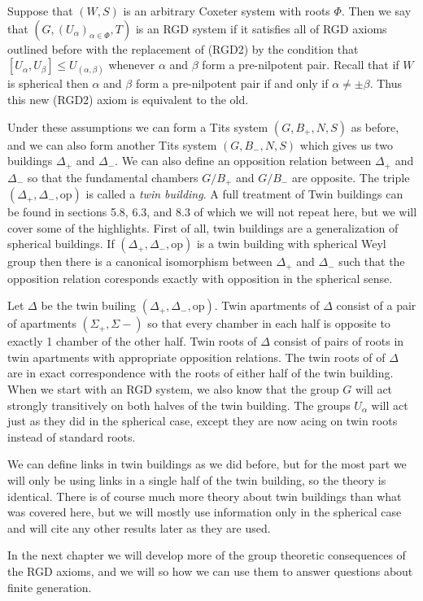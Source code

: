 \documentclass[class=book, crop=false,12 pt]{standalone}
\begin{document}
Suppose that $(W,S)$ is an arbitrary Coxeter system with roots $\Phi.$ Then we say that $(G,(U_\alpha)_{\alpha\in \Phi},T)$ is an RGD system if it satisfies all of RGD axioms outlined before with the replacement of (RGD2) by the condition that $[U_\alpha,U_\beta]\le U_{(\alpha,\beta)}$ whenever $\alpha$ and $\beta$ form a pre-nilpotent pair. Recall that if $W$ is spherical then $\alpha$ and $\beta$ form a pre-nilpotent pair if and only if $\alpha\neq \pm \beta.$ Thus this new (RGD2) axiom is equivalent to the old. 

Under these assumptions we can form a Tits system $(G,B_+,N,S)$ as before, and we can also form another Tits system $(G,B_-,N,S)$ which gives us two buildings $\Delta_+$ and $\Delta_-.$ We can also define an opposition relation between $\Delta_+$ and $\Delta_-$ so that the fundamental chambers $G/B_+$ and $G/B_-$ are opposite. The triple $(\Delta_+,\Delta_-,\mathrm{op})$ is called a \emph{twin building}. A full treatment of Twin buildings can be found in sections 5.8, 6.3, and 8.3 of \cite{buildings} which we will not repeat here, but we will cover some of the highlights. First of all, twin buildings are a generalization of spherical buildings. If $(\Delta_+,\Delta_-,\mathrm{op})$ is a twin building with spherical Weyl group then there is a canonical isomorphism between $\Delta_+$ and $\Delta_-$ such that the opposition relation coresponds exactly with opposition in the spherical sense.

Let $\Delta$ be the twin builing $(\Delta_+,\Delta_-,\mathrm{op}).$ Twin apartments of $\Delta$ consist of a pair of apartments $(\Sigma_+,\Sigma-)$ so that every chamber in each half is opposite to exactly 1 chamber of the other half. Twin roots of $\Delta$ consist of pairs of roots in twin apartments with appropriate opposition relations. The twin roots of of $\Delta$ are in exact correspondence with the roots of either half of the twin building. When we start with an RGD system, we also know that the group $G$ will act strongly transitively on both halves of the twin building. The groups $U_\alpha$ will act just as they did in the spherical case, except they are now acing on twin roots instead of standard roots.

We can define links in twin buildings as we did before, but for the most part we will only be using links in a single half of the twin building, so the theory is identical. There is of course much more theory about twin buildings than what was covered here, but we will mostly use information only in the spherical case and will cite any other results later as they are used.

In the next chapter we will develop more of the group theoretic consequences of the RGD axioms, and we will so how we can use them to answer questions about finite generation.
\end{document}
